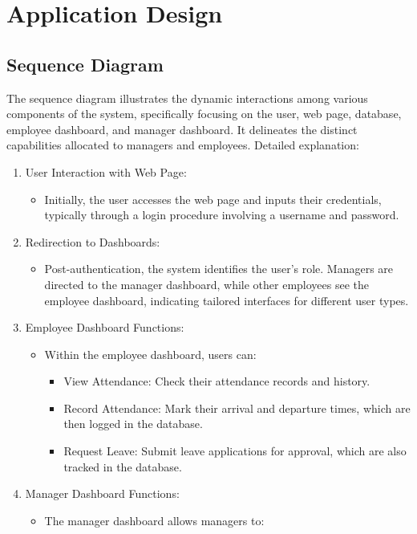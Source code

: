 \documentclass[a4paper, 12pt]{article}
\begin{document}
\newpage
\section{Application Design}
\subsection{Sequence Diagram}
The sequence diagram illustrates the dynamic interactions among various components of the system, specifically focusing on the user, web page, database, employee dashboard, and manager dashboard. It delineates the distinct capabilities allocated to managers and employees. Detailed explanation:
\begin{enumerate}
    \item User Interaction with Web Page:
    \begin{itemize}
        \item Initially, the user accesses the web page and inputs their credentials, typically through a login procedure involving a username and password.
    \end{itemize}
    \item Redirection to Dashboards:
    \begin{itemize}
        \item Post-authentication, the system identifies the user’s role. Managers are directed to the manager dashboard, while other employees see the employee dashboard, indicating tailored interfaces for different user types.
    \end{itemize}
    \item Employee Dashboard Functions:
    \begin{itemize}
        \item Within the employee dashboard, users can:
        \begin{itemize}
            \item View Attendance: Check their attendance records and history.
            \item Record Attendance: Mark their arrival and departure times, which are then logged in the database.
            \item Request Leave: Submit leave applications for approval, which are also tracked in the database.
        \end{itemize}
    \end{itemize}
    \item Manager Dashboard Functions:
    \begin{itemize}
        \item The manager dashboard allows managers to:

\end{itemize}
\end{enumerate}
\end{document}
